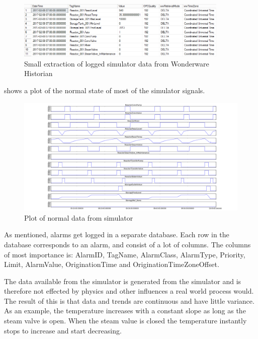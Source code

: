 \documentclass[english, a4paper]{report}
\begin{document}
{{{            \begin{figure}[H]
                \centering \includegraphics[width=0.9\textwidth]{SimulatorData1}
                \caption{Small extraction of logged simulator data from Wonderware Historian}
                \label{fig:simulator_history_data}
            \end{figure}
            
             shows a plot of the normal state of most of the simulator signals. 
            
            \begin{figure}[H]
                \centering \includegraphics[width=\textwidth]{NormalSimData}
                \caption{Plot of normal data from simulator}
                \label{fig:simulator_plot_norm}
            \end{figure}
            
            \par 
            As mentioned, alarms get logged in a separate database. Each row in the database corresponds to an alarm, and consist of a lot of columns. The columns of most importance is: AlarmID, TagName, AlarmClass, AlarmType, Priority, Limit, AlarmValue, OriginationTime and OriginationTimeZoneOffset. 
            \par
            The data available from the simulator is generated from the simulator and is therefore not effected by physics and other influences a real world process would. The result of this is that data and trends are continuous and have little variance. As an example, the temperature increases with a constant slope as long as the steam valve is open. When the steam value is closed the temperature instantly stops to increase and start decreasing.  
        }
        
}}
\end{document}
